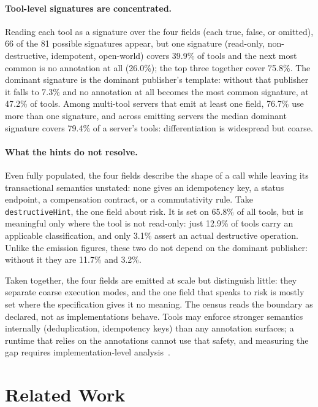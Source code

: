 \documentclass[runningheads]{comsis3}
\begin{document}
\paragraph{Tool-level signatures are concentrated.}
Reading each tool as a signature over the four fields (each true, false, or
omitted), 66 of the 81 possible signatures appear, but one signature
(read-only, non-destructive, idempotent, open-world) covers 39.9\% of tools
and the next most common is no annotation at all (26.0\%); the top three
together cover 75.8\%. The dominant signature is the dominant publisher's
template: without that publisher it falls to 7.3\% and no annotation at all
becomes the most common signature, at 47.2\% of tools. Among multi-tool
servers that emit at least one field, 76.7\% use more than one signature,
and across emitting servers the median dominant signature covers 79.4\% of
a server's tools: differentiation is widespread but coarse.

\paragraph{What the hints do not resolve.}
Even fully populated, the four fields describe the shape of a call while leaving its transactional semantics unstated: none gives an idempotency key, a status endpoint, a compensation contract, or a commutativity rule. Take \texttt{destructiveHint}, the one field about risk. It is set on
65.8\% of all tools, but is meaningful only where the tool is not
read-only: just 12.9\% of tools carry an applicable classification, and
only 3.1\% assert an actual destructive operation. Unlike the emission
figures, these two do not depend on the dominant publisher: without it
they are 11.7\% and 3.2\%.


\medskip

\noindent
Taken together, the four fields are emitted at scale but distinguish little:
they separate coarse execution modes, and the one field that speaks to risk
is mostly set where the specification gives it no meaning. The census reads
the boundary as declared, not as implementations behave. Tools may enforce
stronger semantics internally (deduplication, idempotency keys) than any
annotation surfaces; a runtime that relies on the annotations cannot use that
safety, and measuring the gap requires implementation-level
analysis~\cite{toeppe2026mcpdataset}.

\section{Related Work}
\label{sec:related}
\end{document}
